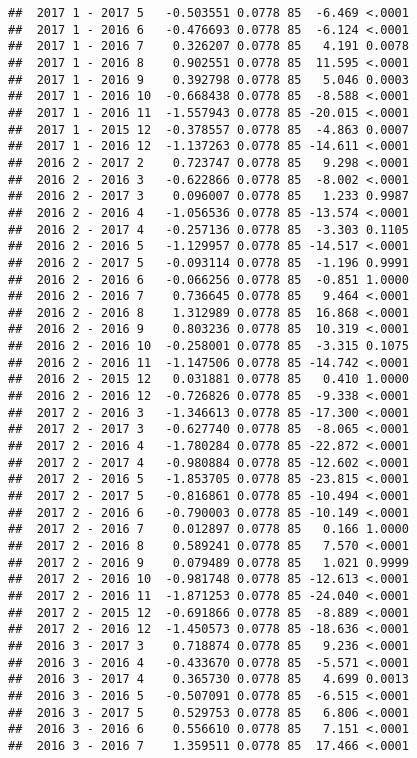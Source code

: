 \documentclass[
]{article}
\begin{document}
\begin{verbatim}
##  2017 1 - 2017 5   -0.503551 0.0778 85  -6.469 <.0001 
##  2017 1 - 2016 6   -0.476693 0.0778 85  -6.124 <.0001 
##  2017 1 - 2016 7    0.326207 0.0778 85   4.191 0.0078 
##  2017 1 - 2016 8    0.902551 0.0778 85  11.595 <.0001 
##  2017 1 - 2016 9    0.392798 0.0778 85   5.046 0.0003 
##  2017 1 - 2016 10  -0.668438 0.0778 85  -8.588 <.0001 
##  2017 1 - 2016 11  -1.557943 0.0778 85 -20.015 <.0001 
##  2017 1 - 2015 12  -0.378557 0.0778 85  -4.863 0.0007 
##  2017 1 - 2016 12  -1.137263 0.0778 85 -14.611 <.0001 
##  2016 2 - 2017 2    0.723747 0.0778 85   9.298 <.0001 
##  2016 2 - 2016 3   -0.622866 0.0778 85  -8.002 <.0001 
##  2016 2 - 2017 3    0.096007 0.0778 85   1.233 0.9987 
##  2016 2 - 2016 4   -1.056536 0.0778 85 -13.574 <.0001 
##  2016 2 - 2017 4   -0.257136 0.0778 85  -3.303 0.1105 
##  2016 2 - 2016 5   -1.129957 0.0778 85 -14.517 <.0001 
##  2016 2 - 2017 5   -0.093114 0.0778 85  -1.196 0.9991 
##  2016 2 - 2016 6   -0.066256 0.0778 85  -0.851 1.0000 
##  2016 2 - 2016 7    0.736645 0.0778 85   9.464 <.0001 
##  2016 2 - 2016 8    1.312989 0.0778 85  16.868 <.0001 
##  2016 2 - 2016 9    0.803236 0.0778 85  10.319 <.0001 
##  2016 2 - 2016 10  -0.258001 0.0778 85  -3.315 0.1075 
##  2016 2 - 2016 11  -1.147506 0.0778 85 -14.742 <.0001 
##  2016 2 - 2015 12   0.031881 0.0778 85   0.410 1.0000 
##  2016 2 - 2016 12  -0.726826 0.0778 85  -9.338 <.0001 
##  2017 2 - 2016 3   -1.346613 0.0778 85 -17.300 <.0001 
##  2017 2 - 2017 3   -0.627740 0.0778 85  -8.065 <.0001 
##  2017 2 - 2016 4   -1.780284 0.0778 85 -22.872 <.0001 
##  2017 2 - 2017 4   -0.980884 0.0778 85 -12.602 <.0001 
##  2017 2 - 2016 5   -1.853705 0.0778 85 -23.815 <.0001 
##  2017 2 - 2017 5   -0.816861 0.0778 85 -10.494 <.0001 
##  2017 2 - 2016 6   -0.790003 0.0778 85 -10.149 <.0001 
##  2017 2 - 2016 7    0.012897 0.0778 85   0.166 1.0000 
##  2017 2 - 2016 8    0.589241 0.0778 85   7.570 <.0001 
##  2017 2 - 2016 9    0.079489 0.0778 85   1.021 0.9999 
##  2017 2 - 2016 10  -0.981748 0.0778 85 -12.613 <.0001 
##  2017 2 - 2016 11  -1.871253 0.0778 85 -24.040 <.0001 
##  2017 2 - 2015 12  -0.691866 0.0778 85  -8.889 <.0001 
##  2017 2 - 2016 12  -1.450573 0.0778 85 -18.636 <.0001 
##  2016 3 - 2017 3    0.718874 0.0778 85   9.236 <.0001 
##  2016 3 - 2016 4   -0.433670 0.0778 85  -5.571 <.0001 
##  2016 3 - 2017 4    0.365730 0.0778 85   4.699 0.0013 
##  2016 3 - 2016 5   -0.507091 0.0778 85  -6.515 <.0001 
##  2016 3 - 2017 5    0.529753 0.0778 85   6.806 <.0001 
##  2016 3 - 2016 6    0.556610 0.0778 85   7.151 <.0001 
##  2016 3 - 2016 7    1.359511 0.0778 85  17.466 <.0001 

\end{verbatim}
\end{document}
